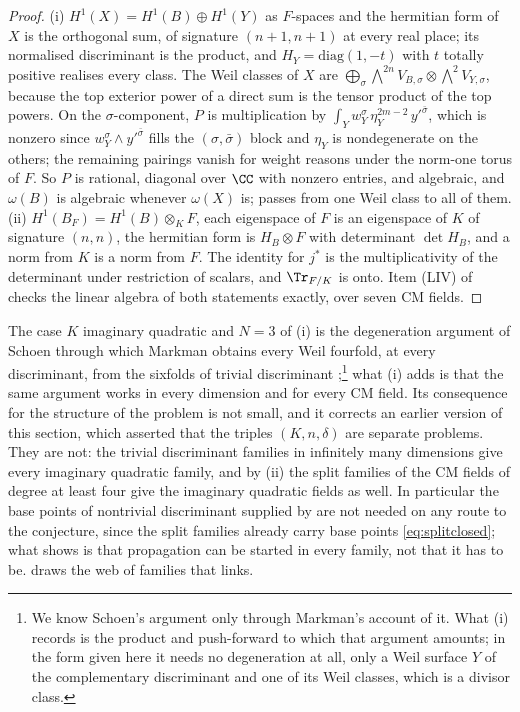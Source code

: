 \begin{proof}
(i) $H^{1}(X)=H^{1}(B)\oplus H^{1}(Y)$ as $F$-spaces and the hermitian form
of $X$ is the orthogonal sum, of signature $(n+1,n+1)$ at every real place;
its normalised discriminant is the product, and $H_{Y}=\mathrm{diag}(1,-t)$
with $t$ totally positive realises every class. The Weil classes of $X$ are
$\bigoplus_{\sigma}\bigwedge^{2n}V_{B,\sigma}\otimes\bigwedge^{2}V_{Y,\sigma}$,
because the top exterior power of a direct sum is the tensor product of the
top powers. On the $\sigma$-component, $P$ is multiplication by
$\int_{Y}w_{Y}^{\sigma}\,\eta_{Y}^{2m-2}\,y'^{\bar\sigma}$, which is nonzero
since $w_{Y}^{\sigma}\wedge y'^{\bar\sigma}$ fills the $(\sigma,\bar\sigma)$
block and $\eta_{Y}$ is nondegenerate on the others; the remaining pairings
vanish for weight reasons under the norm-one torus of $F$. So $P$ is
rational, diagonal over $\CC$ with nonzero entries, and algebraic, and
$\omega(B)$ is algebraic whenever $\omega(X)$ is; 
passes from one Weil class to all of them. (ii) $H^{1}(B_{F})=H^{1}(B)\otimes_{K}F$,
each eigenspace of $F$ is an eigenspace of $K$ of signature $(n,n)$, the
hermitian form is $H_{B}\otimes F$ with determinant $\det H_{B}$, and a norm
from $K$ is a norm from $F$. The identity for $j^{*}$ is the multiplicativity
of the determinant under restriction of scalars, and $\Tr_{F/K}$ is onto.
Item (LIV) of  checks the linear algebra of both
statements exactly, over seven CM fields.
\end{proof}

The case $K$ imaginary quadratic and $N=3$ of (i) is the degeneration argument
of Schoen through which Markman obtains every Weil fourfold, at every
discriminant, from the sixfolds of trivial discriminant
\cite{Mar25a};\footnote{We know Schoen's argument only through Markman's
account of it. What (i) records is the product and push-forward to which that
argument amounts; in the form given here it needs no degeneration at all,
only a Weil surface $Y$ of the complementary discriminant and one of its
Weil classes, which is a divisor class.} what
(i) adds is that the same argument works in every dimension and for every CM
field. Its consequence for the structure of the problem is not small, and it
corrects an earlier version of this section, which asserted that the triples
$(K,n,\delta)$ are separate problems. They are not: the trivial discriminant
families in infinitely many dimensions give every imaginary quadratic family,
and by (ii) the split families of the CM fields of degree at least four give
the imaginary quadratic fields as well. In particular the base points of
nontrivial discriminant supplied by  are not needed on
any route to the conjecture, since the split families already carry base
points \eqref{eq:splitclosed}; what  shows is that
propagation can be started in every family, not that it has to be.
 draws the web of families that  links.

